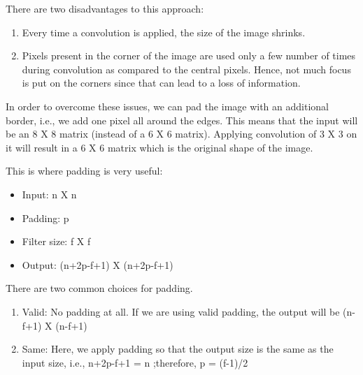 There are two disadvantages to this approach:

\begin{enumerate}
  \item Every time a convolution is applied, the size of the image shrinks.
  \item Pixels present in the corner of the image are used only a few number of times during convolution as compared to the central pixels. Hence, not much focus is put on the corners since that can lead to a loss of information.
\end{enumerate}

In order to overcome these issues, we can pad the image with an additional border, i.e., we add one pixel all around the edges. This means that the input will be an 8 X 8 matrix (instead of a 6 X 6 matrix). Applying convolution of 3 X 3 on it will result in a 6 X 6 matrix which is the original shape of the image.
\par

This is where padding is very useful:

\begin{itemize}
  \item Input: n X n
  \item Padding: p
  \item Filter size: f X f
  \item Output: (n+2p-f+1) X (n+2p-f+1)
\end{itemize}

There are two common choices for padding.

\begin{enumerate}
  \item Valid: No padding at all. If we are using valid padding, the output will be (n-f+1) X (n-f+1)
  \item Same: Here, we apply padding so that the output size is the same as the input size, i.e., n+2p-f+1 = n ;therefore,  p = (f-1)/2 
\end{enumerate}
